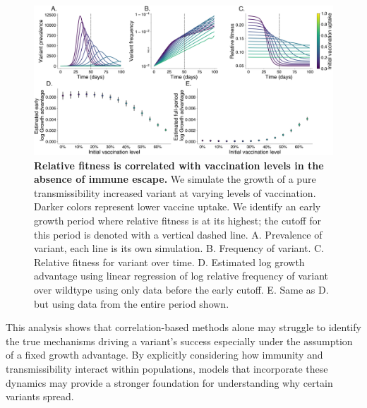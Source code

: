 \documentclass[11pt,oneside,letterpaper]{article}
\begin{document}
\begin{figure}[h]
    \centering
    \includegraphics[width=1.0\linewidth]{./figures/mechanism_identification.png}
    \caption{
      \textbf{Relative fitness is correlated with vaccination levels in the absence of immune escape.}
      We simulate the growth of a pure transmissibility increased variant at varying levels of vaccination.
      Darker colors represent lower vaccine uptake.
      We identify an early growth period where relative fitness is at its highest; the cutoff for this period is denoted with a vertical dashed line.
      A. Prevalence of variant, each line is its own simulation.
      B. Frequency of variant.
      C. Relative fitness for variant over time.
      D. Estimated log growth advantage using linear regression of log relative frequency of variant over wildtype using only data before the early cutoff.
      E. Same as D. but using data from the entire period shown.
    }
    \label{fig:mechanism_identification}
\end{figure}


This analysis shows that correlation-based methods alone may struggle to identify the true mechanisms driving a variant’s success especially under the assumption of a fixed growth advantage.
By explicitly considering how immunity and transmissibility interact within populations, models that incorporate these dynamics may provide a stronger foundation for understanding why certain variants spread.
\end{document}
